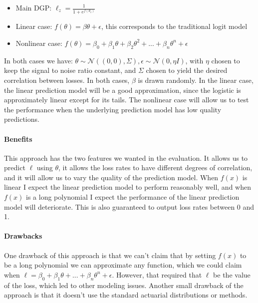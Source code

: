 \documentclass[11pt]{article}
\begin{document}
\begin{itemize}
    \item Main DGP: $\ell_z = \frac{1}{1+e^{f(\theta_z)}}$
    \item Linear case: $f(\theta) = \beta \theta + \epsilon$, this corresponds to the traditional logit model
    \item Nonlinear case: $f(\theta) = \beta_0 + \beta_1 \theta + \beta_2 \theta^2 + ... + \beta_n \theta^n+ \epsilon$
  \end{itemize}

In both cases we have: $\theta \sim \mathcal{N}((0,0),\Sigma), \epsilon \sim \mathcal{N}(0,\eta I)$, with $\eta$ chosen to keep the signal to noise ratio constant, and $\Sigma$ chosen to yield the desired correlation between losses. In both cases, $\beta$ is drawn randomly. In the linear case, the linear prediction model will be a good approximation, since the logistic  is approximately linear except for its tails. The nonlinear case will allow us to test the performance when the underlying prediction model has low quality predictions. 

  \paragraph{Benefits} This approach has the two features we wanted in the evaluation. It allows us to predict $\ell$ using $\theta$, it allows the loss rates to have different degrees of correlation, and it will allow us to vary the quality of the prediction model. When $f(x)$ is linear I expect the linear prediction model to perform reasonably well, and when $f(x)$ is a long polynomial I expect the performance of the linear prediction model will deteriorate. This is also guaranteed to output loss rates between 0 and 1. 

  \paragraph{Drawbacks} One drawback of this approach is that we can't claim that by setting $f(x)$ to be a long polynomial we can approximate any function, which we could claim when $\ell =  \beta_0 + \beta_1 \theta + ... + \beta_n \theta^n +\epsilon$. However, that required that $\ell$ be the value of the loss, which led to other modeling issues. Another small drawback of the approach is that it doesn't use the standard actuarial distributions or methods. 
\end{document}
